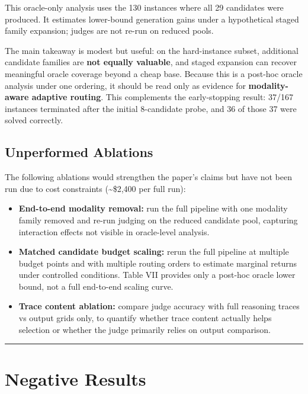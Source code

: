 \documentclass[conference]{IEEEtran}
\providecommand{\tightlist}{%
  \setlength{\itemsep}{0pt}\setlength{\parskip}{0pt}}
\begin{document}
This oracle-only analysis uses the 130 instances where all 29 candidates
were produced. It estimates lower-bound generation gains under a
hypothetical staged family expansion; judges are not re-run on reduced
pools.

The main takeaway is modest but useful: on the hard-instance subset,
additional candidate families are \textbf{not equally valuable}, and
staged expansion can recover meaningful oracle coverage beyond a cheap
base. Because this is a post-hoc oracle analysis under one ordering, it
should be read only as evidence for \textbf{modality-aware adaptive
routing}. This complements the early-stopping result: 37/167 instances
terminated after the initial 8-candidate probe, and 36 of those 37 were
solved correctly.

\subsection{Unperformed Ablations}\label{unperformed-ablations}

The following ablations would strengthen the paper's claims but have not
been run due to cost constraints (\textasciitilde\$2,400 per full run):

\begin{itemize}
\tightlist
\item
  \textbf{End-to-end modality removal:} run the full pipeline with one
  modality family removed and re-run judging on the reduced candidate
  pool, capturing interaction effects not visible in oracle-level
  analysis.
\item
  \textbf{Matched candidate budget scaling:} rerun the full pipeline at
  multiple budget points and with multiple routing orders to estimate
  marginal returns under controlled conditions. Table VII provides only
  a post-hoc oracle lower bound, not a full end-to-end scaling curve.
\item
  \textbf{Trace content ablation:} compare judge accuracy with full
  reasoning traces vs output grids only, to quantify whether trace
  content actually helps selection or whether the judge primarily relies
  on output comparison.
\end{itemize}

\begin{center}\rule{0.5\linewidth}{0.5pt}\end{center}

\section{Negative Results}\label{negative-results}
\end{document}
